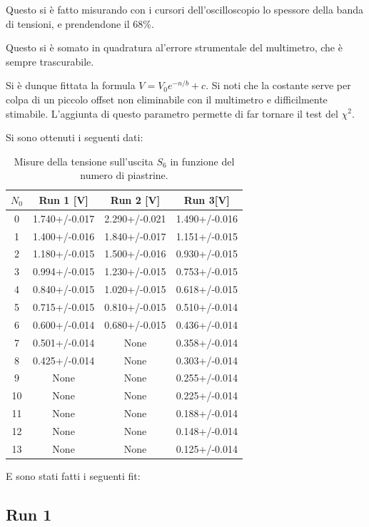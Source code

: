 \documentclass[a4paper,10pt]{article}
\begin{document}
Questo si è fatto misurando con i cursori dell'oscilloscopio lo spessore della banda di tensioni, e prendendone il 68\%. %


Questo si è somato in quadratura al'errore strumentale del multimetro, che è sempre trascurabile. 

Si è dunque fittata la formula $V=V_0e^{-n/b}+c$. Si noti che la costante serve per colpa di un piccolo offset non eliminabile con il multimetro e difficilmente stimabile. L'aggiunta di questo parametro permette di far tornare il test del $\chi^2$. 

Si sono ottenuti i seguenti dati:

\begin{table}[H]
	\centering
	\begin{tabular}{cccc}
		$ N_0 $ & Run 1 [V]& Run 2 [V]& Run 3[V]\\
		\hline
		0 & 1.740+/-0.017 & 2.290+/-0.021 & 1.490+/-0.016\\
		1 & 1.400+/-0.016 & 1.840+/-0.017 & 1.151+/-0.015\\
		2 & 1.180+/-0.015 & 1.500+/-0.016 & 0.930+/-0.015\\
		3 & 0.994+/-0.015 & 1.230+/-0.015 & 0.753+/-0.015\\
		4 & 0.840+/-0.015 & 1.020+/-0.015 & 0.618+/-0.015\\
		5 & 0.715+/-0.015 & 0.810+/-0.015 & 0.510+/-0.014\\
		6 & 0.600+/-0.014 & 0.680+/-0.015 & 0.436+/-0.014\\
		7 & 0.501+/-0.014 & None & 0.358+/-0.014\\
		8 & 0.425+/-0.014 & None & 0.303+/-0.014\\
		9 & None & None & 0.255+/-0.014\\
		10 & None & None & 0.225+/-0.014\\
		11 & None & None & 0.188+/-0.014\\
		12 & None & None & 0.148+/-0.014\\
		13 & None & None & 0.125+/-0.014\\	
	\end{tabular}
\caption{Misure della tensione sull'uscita $ S_6 $ in funzione del numero di piastrine.}
\label{tab:misurine}
\end{table}

E sono stati fatti i seguenti fit:

\subsection{Run 1}
\end{document}
